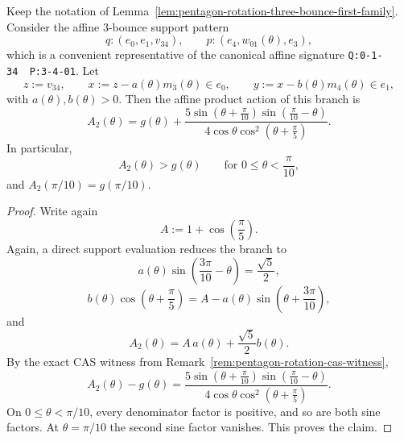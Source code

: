 \begin{unverified}
\begin{lemma}
\label{lem:pentagon-rotation-three-bounce-second-family}
Keep the notation of
Lemma~\ref{lem:pentagon-rotation-three-bounce-first-family}. Consider the
affine 3-bounce support pattern
\[
  q : (e_0,e_1,v_{34}),
  \qquad
  p : (e_4,w_{01}(\theta),e_3),
\]
which is a convenient representative of the canonical affine signature
\texttt{Q:0-1-34\ \ P:3-4-01}. Let
\[
  z := v_{34},
  \qquad
  x := z - a(\theta)m_3(\theta) \in e_0,
  \qquad
  y := x - b(\theta)m_4(\theta) \in e_1,
\]
with $a(\theta), b(\theta) > 0$.
Then the affine product action of this branch is
\[
  A_2(\theta)
  =
  g(\theta)
  +
  \frac{
    5\sin\left(\theta+\frac{\pi}{10}\right)
    \sin\left(\frac{\pi}{10}-\theta\right)
  }
  {
    4\cos\theta\cos^2\left(\theta+\frac{\pi}{5}\right)
  }.
\]
In particular,
\[
  A_2(\theta) > g(\theta)
  \qquad
  \text{for } 0 \le \theta < \frac{\pi}{10},
\]
and $A_2(\pi/10)=g(\pi/10)$.
\end{lemma}

\begin{proof}
Write again
\[
  A := 1+\cos\left(\frac{\pi}{5}\right).
\]
Again, a direct support evaluation reduces the branch to
\[
  a(\theta)\sin\left(\frac{3\pi}{10}-\theta\right) = \frac{\sqrt{5}}{2},
\]
\[
  b(\theta)\cos\left(\theta+\frac{\pi}{5}\right)
  =
  A - a(\theta)\sin\left(\theta+\frac{3\pi}{10}\right),
\]
and
\[
  A_2(\theta)
  =
  A\,a(\theta) + \frac{\sqrt{5}}{2}b(\theta).
\]
By the exact CAS witness from Remark~\ref{rem:pentagon-rotation-cas-witness},
\[
  A_2(\theta) - g(\theta)
  =
  \frac{
    5\sin\left(\theta+\frac{\pi}{10}\right)
    \sin\left(\frac{\pi}{10}-\theta\right)
  }
  {
    4\cos\theta\cos^2\left(\theta+\frac{\pi}{5}\right)
  }.
\]
On $0 \le \theta < \pi/10$, every denominator factor is positive, and so are
both sine factors. At $\theta=\pi/10$ the second sine factor vanishes. This
proves the claim.
\end{proof}
\end{unverified}

